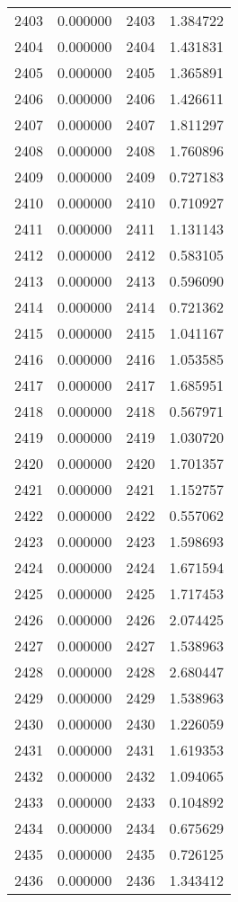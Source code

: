 \documentclass[12pt]{article}
\begin{document}
\begin{longtable}{@{}cccc@{}}
2403 & 0.000000 & 2403 & 1.384722 \\
2404 & 0.000000 & 2404 & 1.431831 \\
2405 & 0.000000 & 2405 & 1.365891 \\
2406 & 0.000000 & 2406 & 1.426611 \\
2407 & 0.000000 & 2407 & 1.811297 \\
2408 & 0.000000 & 2408 & 1.760896 \\
2409 & 0.000000 & 2409 & 0.727183 \\
2410 & 0.000000 & 2410 & 0.710927 \\
2411 & 0.000000 & 2411 & 1.131143 \\
2412 & 0.000000 & 2412 & 0.583105 \\
2413 & 0.000000 & 2413 & 0.596090 \\
2414 & 0.000000 & 2414 & 0.721362 \\
2415 & 0.000000 & 2415 & 1.041167 \\
2416 & 0.000000 & 2416 & 1.053585 \\
2417 & 0.000000 & 2417 & 1.685951 \\
2418 & 0.000000 & 2418 & 0.567971 \\
2419 & 0.000000 & 2419 & 1.030720 \\
2420 & 0.000000 & 2420 & 1.701357 \\
2421 & 0.000000 & 2421 & 1.152757 \\
2422 & 0.000000 & 2422 & 0.557062 \\
2423 & 0.000000 & 2423 & 1.598693 \\
2424 & 0.000000 & 2424 & 1.671594 \\
2425 & 0.000000 & 2425 & 1.717453 \\
2426 & 0.000000 & 2426 & 2.074425 \\
2427 & 0.000000 & 2427 & 1.538963 \\
2428 & 0.000000 & 2428 & 2.680447 \\
2429 & 0.000000 & 2429 & 1.538963 \\
2430 & 0.000000 & 2430 & 1.226059 \\
2431 & 0.000000 & 2431 & 1.619353 \\
2432 & 0.000000 & 2432 & 1.094065 \\
2433 & 0.000000 & 2433 & 0.104892 \\
2434 & 0.000000 & 2434 & 0.675629 \\
2435 & 0.000000 & 2435 & 0.726125 \\
2436 & 0.000000 & 2436 & 1.343412 \\

\end{longtable}
\end{document}
